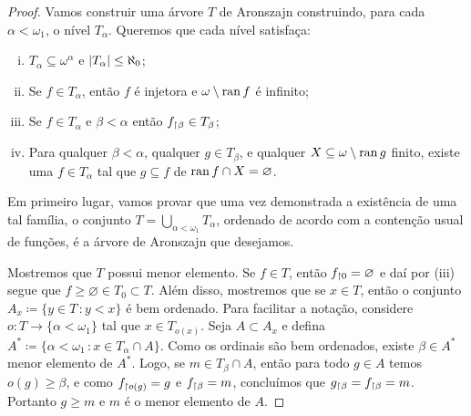 \documentclass[a4paper]{article}
\begin{document}
\begin{proof}
  Vamos construir uma árvore \(T\) de Aronszajn construindo, para cada
  \(\alpha<\omega_1\), o nível \(T_\alpha\). Queremos que cada nível satisfaça:
  \begin{enumerate}[(i)]
    \item \(T_{\alpha} \subseteq \omega^{\alpha}\) e \(\vert T_{\alpha} \vert \le \aleph_0\);
    \item Se \(f \in T_{\alpha}\), então \(f\) é injetora e \(\omega\setminus \operatorname{ran} f\) é infinito;
    \item Se \(f \in T_{\alpha}\) e \(\beta < \alpha\) então \(f_{\upharpoonright \beta} \in T_{\beta}\);
    \item Para qualquer \(\beta < \alpha\), qualquer \(g \in T_{\beta}\), e
    qualquer \(X \subseteq \omega\setminus \operatorname{ran} g\) finito, existe uma \(f \in
    T_{\alpha}\) tal que \(g \subseteq f\) de \(\operatorname{ran} f \cap X = \varnothing\).
    \end{enumerate}

    Em primeiro lugar, vamos provar  que uma vez demonstrada a existência de uma tal
    família, o conjunto  \(T=\bigcup_{\alpha<\omega_1} T_\alpha\), ordenado de
    acordo com a contenção usual de funções, é a árvore  de
    Aronszajn que desejamos.
    
    Mostremos que \(T\) possui menor elemento. Se \(f\in T\), então
    \(f_{\upharpoonright 0}=\varnothing\) e daí por (iii) segue que
    \mbox{\(f\geq\varnothing\in T_0\subset T\)}. Além disso, mostremos que se
    \(x\in T\), então o conjunto \(A_x\coloneqq\{y\in
    T\,\colon y<x\}\) é bem ordenado. Para facilitar a notação, considere
    \(o\colon T\rightarrow \{\alpha<\omega_1\}\) tal que \(x\in T_{o(x)}\). Seja
    \(A\subset A_x\) e defina \(A^\ast\coloneqq \{\alpha<\omega_1\,\colon
    x\in T_\alpha\cap A\}\). 
    Como os ordinais são bem ordenados, existe \(\beta\in A^\ast\) menor
    elemento de \(A^\ast\).
    Logo, se \(m\in T_\beta\cap A\), então para todo \(g\in A\) temos
    \(o(g)\geq\beta\),  e como \(f_{\upharpoonright o(g)}=g\) e \(f_{\upharpoonright \beta}=m\),
    concluímos que \(g_{\upharpoonright \beta}=f_{\upharpoonright \beta}=m\).
    Portanto \(g\geq m\) e \(m\) é o menor elemento de \(A\).
    

\end{proof}
\end{document}
